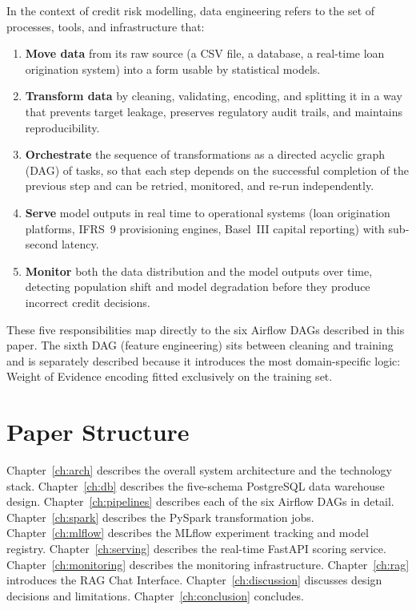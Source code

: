\documentclass[12pt,a4paper]{report}
\begin{document}
In the context of credit risk modelling, data engineering refers to the set of processes, tools, and infrastructure that:
\begin{enumerate}
  \item \textbf{Move data} from its raw source (a CSV file, a database, a real-time loan origination system) into a form usable by statistical models.
  \item \textbf{Transform data} by cleaning, validating, encoding, and splitting it in a way that prevents target leakage, preserves regulatory audit trails, and maintains reproducibility.
  \item \textbf{Orchestrate} the sequence of transformations as a directed acyclic graph (DAG) of tasks, so that each step depends on the successful completion of the previous step and can be retried, monitored, and re-run independently.
  \item \textbf{Serve} model outputs in real time to operational systems (loan origination platforms, IFRS~9 provisioning engines, Basel~III capital reporting) with sub-second latency.
  \item \textbf{Monitor} both the data distribution and the model outputs over time, detecting population shift and model degradation before they produce incorrect credit decisions.
\end{enumerate}

These five responsibilities map directly to the six Airflow DAGs described in this paper. The sixth DAG (feature engineering) sits between cleaning and training and is separately described because it introduces the most domain-specific logic: Weight of Evidence encoding fitted exclusively on the training set.

\section{Paper Structure}

Chapter~\ref{ch:arch} describes the overall system architecture and the technology stack. Chapter~\ref{ch:db} describes the five-schema PostgreSQL data warehouse design. Chapter~\ref{ch:pipelines} describes each of the six Airflow DAGs in detail. Chapter~\ref{ch:spark} describes the PySpark transformation jobs. Chapter~\ref{ch:mlflow} describes the MLflow experiment tracking and model registry. Chapter~\ref{ch:serving} describes the real-time FastAPI scoring service. Chapter~\ref{ch:monitoring} describes the monitoring infrastructure. Chapter~\ref{ch:rag} introduces the RAG Chat Interface. Chapter~\ref{ch:discussion} discusses design decisions and limitations. Chapter~\ref{ch:conclusion} concludes.
\end{document}
